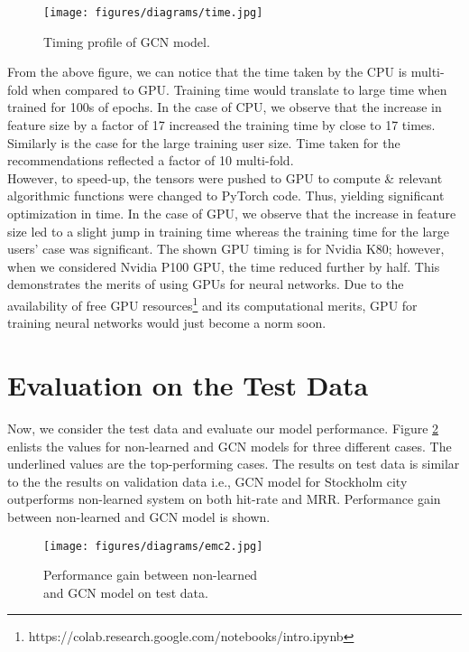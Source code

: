 \documentclass{kththesis}
\begin{document}
\begin{figure}[h!]
\centering
\texttt{[image: figures/diagrams/time.jpg]}
\caption{Timing profile of GCN model.}
\label{fig:time}
\end{figure}

From the above figure, we can notice that the time taken by the CPU is multi-fold when compared to GPU. Training time would translate to large time when trained for 100s of epochs. In the case of CPU, we observe that the increase in feature size by a factor of 17 increased the training time by close to 17 times. Similarly is the case for the large training user size. Time taken for the recommendations reflected a factor of 10 multi-fold. \\

However, to speed-up, the tensors were pushed to GPU to compute \& relevant algorithmic functions were changed to PyTorch code. Thus, yielding significant optimization in time. In the case of GPU, we observe that the increase in feature size led to a slight jump in training time whereas the training time for the large users' case was significant. The shown GPU timing is for Nvidia K80; however, when we considered Nvidia P100 GPU, the time reduced further by half. This demonstrates the merits of using GPUs for neural networks. Due to the availability of free GPU resources\footnote{https://colab.research.google.com/notebooks/intro.ipynb} and its computational merits, GPU for training neural networks would just become a norm soon. \\


\newpage
\section{Evaluation on the Test Data}
Now, we consider the test data and evaluate our model performance. Figure \ref{fig:emc2} enlists the values for non-learned and GCN models for three different cases. The underlined values are the top-performing cases. The results on test data is similar to the the results on validation data i.e., GCN model for Stockholm city outperforms non-learned system on both hit-rate and MRR. Performance gain between non-learned and GCN model is shown. \\

\begin{figure}[h!]
\centering
\captionsetup{justification=centering}
\texttt{[image: figures/diagrams/emc2.jpg]}
\caption{Performance gain between non-learned \\ and GCN model on test data.}
\label{fig:emc2}
\end{figure}
\end{document}
